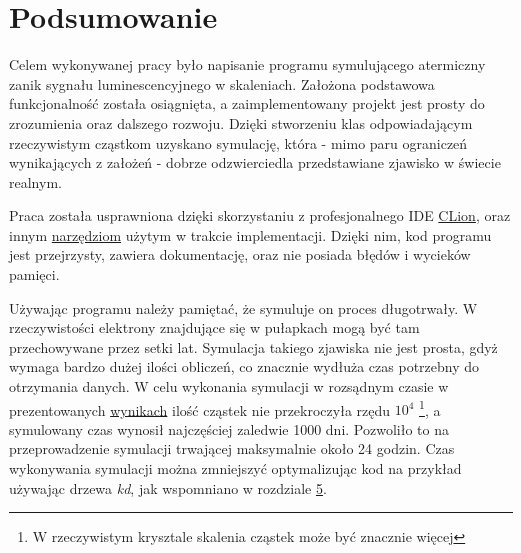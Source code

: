 \chapter{Podsumowanie}

Celem wykonywanej pracy było napisanie programu symulującego atermiczny zanik sygnału luminescencyjnego w skaleniach.  Założona podstawowa funkcjonalność została osiągnięta, a zaimplementowany projekt jest prosty do zrozumienia oraz dalszego rozwoju. Dzięki stworzeniu klas odpowiadającym rzeczywistym cząstkom uzyskano symulację, która - mimo paru ograniczeń wynikających z założeń - dobrze odzwierciedla przedstawiane zjawisko w świecie realnym.

Praca została usprawniona dzięki skorzystaniu z profesjonalnego IDE \hyperref[tech:clion]{CLion}, oraz innym \hyperref[tech:all]{narzędziom} użytym w trakcie implementacji. Dzięki nim, kod programu jest przejrzysty, zawiera dokumentację, oraz nie posiada błędów i wycieków pamięci.

Używając programu należy pamiętać, że symuluje on proces długotrwały. W rzeczywistości elektrony znajdujące się w pułapkach mogą być tam przechowywane przez setki lat. Symulacja takiego zjawiska nie jest prosta, gdyż wymaga bardzo dużej ilości obliczeń, co znacznie wydłuża czas potrzebny do otrzymania danych. W celu wykonania symulacji w rozsądnym czasie w  prezentowanych  \hyperref[wynik:wykres]{wynikach} ilość cząstek nie przekroczyła rzędu $10^{4}$ \footnote{W rzeczywistym krysztale skalenia cząstek może być znacznie więcej}, a symulowany czas wynosił najczęściej zaledwie 1000 dni. Pozwoliło to na przeprowadzenie symulacji trwającej maksymalnie około 24 godzin. Czas wykonywania symulacji można zmniejszyć optymalizując kod na przykład używając drzewa \emph{kd}, jak wspomniano w rozdziale \hyperref[rozwoj:1]{5}. 
